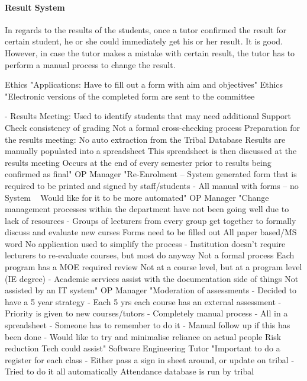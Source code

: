 \paragraph{Result System} In regards to the results of the students, once a tutor confirmed the result for certain student, he or she could immediately get his or her result. It is good. However, in case the tutor makes a mistake with certain result, the tutor has to perform a manual process to change the result.  

Ethics	"Applications:
Have to fill out a form with aim and objectives"
Ethics	"Electronic versions of the completed form are sent to the committee

- Results Meeting:
     Used to identify students that may need additional Support
     Check consistency of grading
     Not a formal cross-checking process
     Preparation for the results meeting:
       No auto extraction from the Tribal Database
       Results are manually populated into a spreadsheet
       This spreadsheet is then discussed at the results meeting
       Occurs at the end of every semester prior to results being confirmed as final"
OP Manager	"Re-Enrolment – System generated form that is required to be printed and signed by staff/students
- All manual with forms – no System
   Would like for it to be more automated"
OP Manager	"Change management processes within the department have not been going well due to lack of resources
  - Groups of lecturers from every group get together to formally discuss and evaluate new curses
      Forms need to be filled out
      All paper based/MS word
      No application used to simplify the process
  - Institution doesn’t require lecturers to re-evaluate courses, but most do anyway
      Not a formal process
      Each program has a MOE required review
      Not at a course level, but at a program level (IE degree)
  - Academic services assist with the documentation side of things
      Not assisted by an IT system"
OP Manager	"Moderation of assessments
  - Decided to have a 5 year strategy
  - Each 5 yrs each course has an external assessment
  - Priority is given to new courses/tutors
  - Completely manual process
  - All in a spreadsheet
  - Someone has to remember to do it
  - Manual follow up if this has been done
  - Would like to try and minimalise reliance on actual people 
      Risk reduction
      Tech could assist"
Software Engineering Tutor	"Important to do a register for each class
  - Either pass a sign in sheet around, or update on tribal
  - Tried to do it all automatically
      Attendance database is run by tribal
